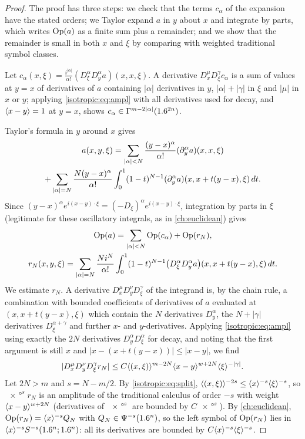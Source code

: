 \begin{proof}
The proof has three steps: we check that the terms $c_\alpha$ of the
expansion have the stated orders; we Taylor expand $a$ in $y$ about $x$ and
integrate by parts, which writes $\operatorname{Op}(a)$ as a finite sum plus a remainder;
and we show that the remainder is small in both $x$ and $\xi$ by comparing
with weighted traditional symbol classes.

Let $c_\alpha(x,\xi)=\frac{i^{|\alpha|}}{\alpha!}(D_\xi^\alpha D_y^\alpha a)(x,x,\xi)$.
A derivative $D_x^\mu D_\xi^\gamma c_\alpha$ is a sum of values at $y=x$ of
derivatives of $a$ containing $|\alpha|$ derivatives in $y$, $|\alpha|+|\gamma|$
in $\xi$ and $|\mu|$ in $x$ or $y$; applying \eqref{isotropic:eq:ampl} with all
derivatives used for decay, and $\langle x-y\rangle=1$ at $y=x$, shows
$c_\alpha\in\Gamma^{m-2|\alpha|}(1.6^{2n})$.

Taylor's formula in $y$ around $x$ gives
\begin{multline*}
  a(x,y,\xi)=\sum_{|\alpha|<N}\frac{(y-x)^\alpha}{\alpha!}(\partial_y^\alpha a)(x,x,\xi)\\
  +\sum_{|\alpha|=N}\frac{N(y-x)^\alpha}{\alpha!}\int_0^1(1-t)^{N-1}(\partial_y^\alpha a)(x,x+t(y-x),\xi)\,dt .
\end{multline*}
Since $(y-x)^\alpha e^{i(x-y)\cdot\xi}=(-D_\xi)^\alpha e^{i(x-y)\cdot\xi}$,
integration by parts in $\xi$ (legitimate for these oscillatory integrals, as
in \cref{ch:euclidean}) gives
\begin{equation}\label{isotropic:eq:taylor-remainder}
\begin{gathered}
  \operatorname{Op}(a)=\sum_{|\alpha|<N}\operatorname{Op}(c_\alpha)+\operatorname{Op}(r_N),\\
  r_N(x,y,\xi)=\sum_{|\alpha|=N}\frac{N i^N}{\alpha!}\int_0^1(1-t)^{N-1}
  \bigl(D_\xi^\alpha D_y^\alpha a\bigr)(x,x+t(y-x),\xi)\,dt .
\end{gathered}
\end{equation}
We estimate $r_N$. A derivative $D_x^\mu D_y^\nu D_\xi^\gamma$ of the
integrand is, by the chain rule, a combination with bounded coefficients of
derivatives of $a$ evaluated at $(x,x+t(y-x),\xi)$ which contain the $N$
derivatives $D_y^\alpha$, the $N+|\gamma|$ derivatives $D_\xi^{\alpha+\gamma}$
and further $x$- and $y$-derivatives. Applying \eqref{isotropic:eq:ampl} using
exactly the $2N$ derivatives $D_y^\alpha D_\xi^\alpha$ for decay, and noting
that the first argument is still $x$ and $|x-(x+t(y-x))|\le|x-y|$, we find
\begin{equation*}
  |D_x^\mu D_y^\nu D_\xi^\gamma r_N|\le C\langle (x,\xi)\rangle^{m-2N}\langle x-y\rangle^{w+2N}\langle \xi\rangle^{-|\gamma|}.
\end{equation*}
Let $2N>m$ and $s=N-m/2$. By \eqref{isotropic:eq:split},
$\langle (x,\xi)\rangle^{-2s}\le\langle x\rangle^{-s}\langle \xi\rangle^{-s}$, so $\ang{x}^sr_N$ is an amplitude
of the traditional calculus of order $-s$ with weight $\langle x-y\rangle^{w+2N}$
(derivatives of $\ang{x}^s$ are bounded by $C\ang{x}^s$). By
\cref{ch:euclidean}, $\operatorname{Op}(r_N)=\langle x\rangle^{-s}Q_N$ with $Q_N\in\Psi^{-s}(1.6^n)$,
so the left symbol of $\operatorname{Op}(r_N)$ lies in $\langle x\rangle^{-s}S^{-s}(1.6^n;1.6^n)$: all its
derivatives are bounded by $C\langle x\rangle^{-s}\langle \xi\rangle^{-s}$.


\end{proof}
